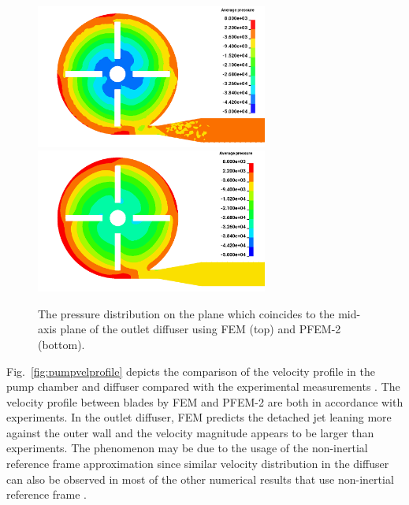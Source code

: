 \begin{figure}[htbp]
    \centering
    \includegraphics[width=3in]{imgs/nozzle_pump/pumppres_fem.png}\\
    \vspace{.5cm}
    \includegraphics[width=3in]{imgs/nozzle_pump/pumppres_pfem.png}
    \caption{The pressure distribution on the plane which coincides to the mid-axis plane of the outlet diffuser using FEM (top) and PFEM-2 (bottom).}
    \label{fig:pumppres}
\end{figure}

Fig.~\ref{fig:pumpvelprofile} depicts the comparison of the velocity profile in the pump chamber and diffuser compared with the experimental measurements \cite{mali_cfd}. The velocity profile between blades by FEM and PFEM-2 are both in accordance with experiments. In the outlet diffuser, FEM predicts the detached jet leaning more against the outer wall and the velocity magnitude appears to be larger than experiments. The phenomenon may be due to the usage of the non-inertial reference frame approximation since similar velocity distribution in the diffuser can also be observed in most of the other numerical results that use non-inertial reference frame \cite{mali_cfd}.  
 
